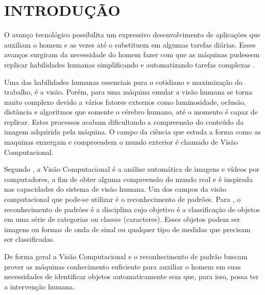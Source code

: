 \chapter*[Introdução]{\textbf{\uppercase{Introdução}}}


O avanço tecnológico possibilita um expressivo desenvolvimento de aplicações que auxiliam o homem e as vezes até o substituem em algumas tarefas diárias. Esses avanços surgiram da necessidade do homem fazer com que as máquinas pudessem replicar habilidades humanas simplificando e automatizando tarefas complexas \cite{forsyth2012}.

Uma das habilidades humanas essenciais para o cotidiano e maximização do trabalho, é a visão. Porém, para uma máquina emular a visão humana se torna muito complexo devido a vários fatores externos como luminosidade, oclusão, distância e algoritmos que somente o cérebro humano, até o momento é capaz de replicar. Estes processos acabam dificultando a compreensão do conteúdo da imagem adquirida pela máquina.  O campo da ciência que estuda a forma como as maquinas enxergam e compreendem o mundo exterior é chamado de Visão Computacional.
 
Segundo \cite{dawson2014}, a Visão Computacional é a análise automática de imagens e vídeos por computadores, a fim de obter alguma compreensão do mundo real e é inspirada nas capacidades do sistema de visão humana.  Um dos campos da visão computacional que pode-se utilizar é o reconhecimento de padrões. Para , o reconhecimento de padrões é a disciplina cujo objetivo é a classificação de objetos em uma série de categorias ou classes (caracteres). Esses objetos podem ser imagens ou formas de onda de sinal ou qualquer tipo de medidas que precisam ser classificadas.

De forma geral a Visão Computacional e o reconhecimento de padrão buscam prover as máquinas conhecimento suficiente para auxiliar o homem em suas necessidades de identificar objetos automaticamente sem que, para isso, possa ter a intervenção humana.

